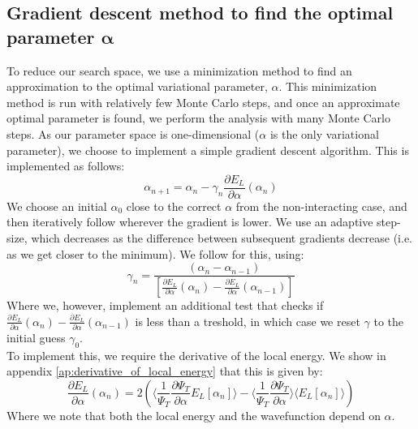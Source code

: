 \documentclass[a4paper, 10pt]{article}
\begin{document}
	\subsection{Gradient descent method to find the optimal parameter $\boldsymbol{\alpha}$}
	To reduce our search space, we use a minimization method to find an approximation to the optimal variational parameter, $\alpha$. This minimization method is run with relatively few Monte Carlo steps, and once an approximate optimal parameter is found, we perform the analysis with many Monte Carlo steps. As our parameter space is one-dimensional ($\alpha$ is the only variational parameter), we choose to implement a simple gradient descent algorithm. This is implemented as follows:
	\begin{equation}
	\alpha_{n+1}=\alpha_n-\gamma_n \frac{\partial E_L}{\partial \alpha} (\alpha_n)
	\end{equation}
	We choose an initial $\alpha_0$ close to the correct $\alpha$ from the non-interacting case, and then iteratively follow wherever the gradient is lower. We use an adaptive step-size, which decreases as the difference between subsequent gradients decrease (i.e. as we get closer to the minimum). We follow \cite{doi:10.1093/imanum/8.1.141} for this, using:
	\begin{equation}
	\gamma_n=\frac{(\alpha_n-\alpha_{n-1})}{[\frac{\partial E_L}{\partial \alpha}(\alpha_n)-\frac{\partial E_L}{\partial \alpha}(\alpha_{n-1})]}
	\end{equation}
	Where we, however, implement an additional test that checks if $\frac{\partial E_L}{\partial \alpha}(\alpha_n)-\frac{\partial E_L}{\partial \alpha}(\alpha_{n-1})$ is less than a treshold, in which case we reset $\gamma$ to the initial guess $\gamma_0$.\\
	\linebreak	
	To implement this, we require the derivative of the local energy. We show in appendix \ref{ap:derivative_of_local_energy} that this is given by:
	\begin{equation}
	\frac{\partial E_L}{\partial \alpha}(\alpha_n)=2\left(\big\langle \frac{1}{\Psi_T}\frac{\partial \Psi_T}{\partial \alpha}E_L[\alpha_n]\big\rangle-\big\langle \frac{1}{\Psi_T}\frac{\partial \Psi_T}{\partial \alpha}\big\rangle \big\langle E_L[\alpha_n]\big\rangle\right)
	\end{equation}
	Where we note that both the local energy and the wavefunction depend on $\alpha$.
\end{document}
